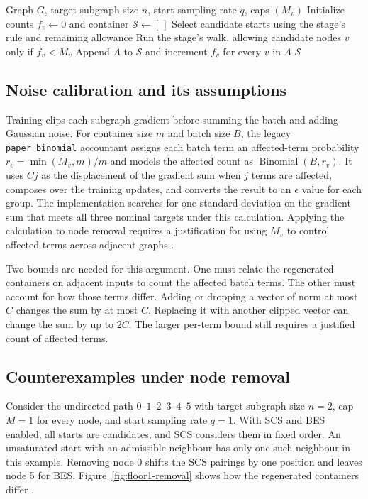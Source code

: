 \begin{algorithm}[!htbp]
\caption{Shared counting in Occurrence-Capped PrivIM}\label{alg:floor1-sampler}
\begin{algorithmic}[1]
\Require Graph $G$, target subgraph size $n$, start sampling rate $q$, caps $(M_v)$
\State Initialize counts $f_v\gets 0$ and container $\mathcal S\gets [\,]$
 \State Select candidate starts using the stage's rule and remaining allowance
   \State Run the stage's walk, allowing candidate nodes $v$ only if $f_v<M_v$
    \State Append $A$ to $\mathcal S$ and increment $f_v$ for every $v$ in $A$
   \EndIf
  \EndIf
 \EndFor
\EndFor
\State \Return $\mathcal S$
\end{algorithmic}
\end{algorithm}

\subsection{Noise calibration and its assumptions}
Training clips each subgraph gradient before summing the batch and adding Gaussian noise. For container size $m$ and batch size $B$, the legacy \texttt{paper\_binomial} accountant assigns each batch term an affected-term probability $r_v=\min(M_v,m)/m$ and models the affected count as $\operatorname{Binomial}(B,r_v)$. It uses $Cj$ as the displacement of the gradient sum when $j$ terms are affected, composes over the training updates, and converts the result to an $\epsilon$ value for each group. The implementation searches for one standard deviation on the gradient sum that meets all three nominal targets under this calculation. Applying the calculation to node removal requires a justification for using $M_v$ to control affected terms across adjacent graphs \cite{floor1audit,floor1runs}.

Two bounds are needed for this argument. One must relate the regenerated containers on adjacent inputs to count the affected batch terms. The other must account for how those terms differ. Adding or dropping a vector of norm at most $C$ changes the sum by at most $C$. Replacing it with another clipped vector can change the sum by up to $2C$. The larger per-term bound still requires a justified count of affected terms.

\subsection{Counterexamples under node removal}
Consider the undirected path $0$--$1$--$2$--$3$--$4$--$5$ with target subgraph size $n=2$, cap $M=1$ for every node, and start sampling rate $q=1$. With SCS and BES enabled, all starts are candidates, and SCS considers them in fixed order. An unsaturated start with an admissible neighbour has only one such neighbour in this example. Removing node 0 shifts the SCS pairings by one position and leaves node 5 for BES. Figure~\ref{fig:floor1-removal} shows how the regenerated containers differ \cite{floor1audit}.

